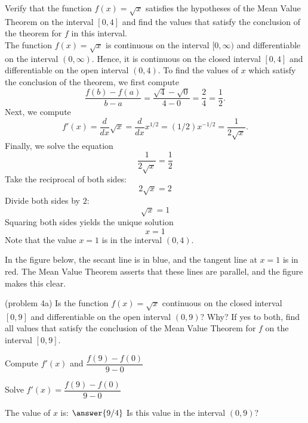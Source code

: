 \documentclass[handout]{ximera}
\begin{document}
\begin{example}[example 4]
Verify that the function $f(x) = \sqrt x$ satisfies the hypotheses of the Mean Value Theorem
on the interval $[0,4]$ and find the values that satisfy the conclusion of the theorem for $f$ in this interval.\\
The function $f(x) = \sqrt x$ is continuous on the interval $[0, \infty)$  and differentiable on the interval $(0, \infty)$. 
Hence, it is continuous on the closed interval $[0, 4]$ and differentiable on the open interval $(0, 4)$. 
To find the values of $x$ which satisfy the conclusion of the theorem, we first compute
\[\frac{f(b) - f(a)}{b-a} = \frac{\sqrt 4 - \sqrt 0}{4-0} = \frac{2}{4} = \frac{1}{2}.\]
Next, we compute
\[f'(x) = \frac{d}{dx} \sqrt x = \frac{d}{dx} x^{1/2} = (1/2)x^{-1/2} = \frac{1}{2\sqrt x}.\]
Finally, we solve the equation
\[\frac{1}{2\sqrt x} = \frac{1}{2}\]
Take the reciprocal of both sides:
\[2\sqrt x = 2\]
Divide both sides by $2$: 
\[\sqrt x = 1\]
Squaring both sides yields the unique solution
\[ x=1\]
Note that the value $x = 1$ is in the interval $(0,4)$.

In the figure below, the secant line is in blue, 
and the tangent line at $x = 1$ is in red. The Mean Value Theorem asserts that these lines are parallel, and the figure makes this clear.

\begin{image}
\end{image}


\end{example}

\begin{problem}(problem 4a)
  Is the function $f(x) = \sqrt x$ continuous on the closed interval $[0,9]$ and differentiable on the open interval $(0,9)$? Why?
  If yes to both, find all values that satisfy the conclusion of the Mean Value Theorem for $f$ on the interval $[0,9]$.
	
    \begin{hint}
      Compute $f'(x)$ and $\dfrac{f(9) - f(0)}{9-0}$
    \end{hint}
		\begin{hint}
		  Solve $f'(x) = \dfrac{f(9) - f(0)}{9-0}$
		\end{hint}
		
		The value of $x$ is:
		 $\answer{9/4}$
     Is this value in the interval $(0,9)$?
\end{problem}
\end{document}
